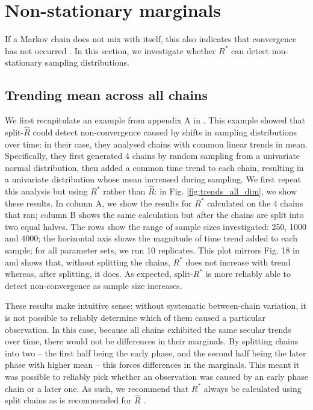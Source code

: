 \documentclass{article}
\begin{document}
\section{Non-stationary marginals}\label{sec:non-stationary}
If a Markov chain does not mix with itself, this also indicates that convergence has not occurred \cite{gelman2013bayesian}. In this section, we investigate whether $R^*$ can detect non-stationary sampling distributions.

\subsection{Trending mean across all chains}\label{sec:non-stationary_chains}
We first recapitulate an example from appendix A in \cite{vehtari2019rank}. This example showed that split-$\widehat{R}$ could detect non-convergence caused by shifts in sampling distributions over time: in their case, they analysed chains with common linear trends in mean. Specifically, they first generated 4 chains by random sampling from a univariate normal distribution, then added a common time trend to each chain, resulting in a univariate distribution whose mean increased during sampling. We first repeat this analysis but using $R^*$ rather than $\widehat{R}$: in Fig. \ref{fig:trends_all_dim}, we show these results. In column A, we show the results for $R^*$ calculated on the 4 chains that ran; column B shows the same calculation but after the chains are split into two equal halves. The rows show the range of sample sizes investigated: 250, 1000 and 4000; the horizontal axis shows the magnitude of time trend added to each sample; for all parameter sets, we run 10 replicates. This plot mirrors Fig. 18 in \cite{vehtari2019rank} and shows that, without splitting the chains, $R^*$ does not increase with trend whereas, after splitting, it does. As expected, split-$R^*$ is more reliably able to detect non-convergence as sample size increases.

These results make intuitive sense: without systematic between-chain variation, it is not possible to reliably determine which of them caused a particular observation. In this case, because all chains exhibited the same secular trends over time, there would not be differences in their marginals. By splitting chains into two -- the first half being the early phase, and the second half being the later phase with higher mean -- this forces differences in the marginals. This meant it was possible to reliably pick whether an observation was caused by an early phase chain or a later one. As such, we recommend that $R^*$ always be calculated using split chains as is recommended for $\widehat{R}$ \citep{carpenter2017stan,vehtari2019rank}.
\end{document}
